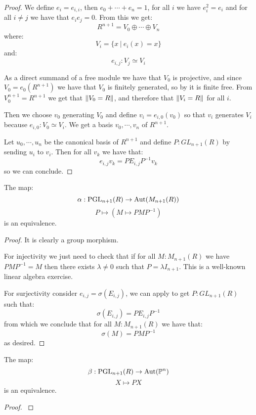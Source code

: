 \begin{proof}
We define $e_i = e_{i,i}$, then $e_0+\cdots+e_n = 1$, for all $i$ we have $e_i^2=e_i$ and for all $i\not=j$ we have that $e_ie_j=0$. From this we get:
\[R^{n+1} = V_0\oplus\cdots\oplus V_n\]
where:
\[V_i = \{x\ |\ e_i(x)=x\}\]
and:
\[e_{i,j}:V_j\simeq V_i\]

As a direct summand of a free module we have that $V_0$ is projective, and since $V_0 = e_{0}(R^{n+1})$ we have that $V_0$ is finitely generated, so by  it is finite free. From $V_0^{n+1}=R^{n+1}$ we get that $\lVert V_0=R \rVert$, and therefore that $\lVert V_i=R \rVert$ for all $i$.

Then we choose $v_0$ generating $V_0$ and define $v_i = e_{i,0}(v_0)$ so that $v_i$ generates $V_i$ because $e_{i,0}:V_0\simeq V_i$. We get a basis $v_0,\cdots,v_n$ of $R^{n+1}$.

Let $u_0,\cdots,u_n$ be the canonical basis of $R^{n+1}$ and define $P:GL_{n+1}(R)$ by sending $u_i$ to $v_i$. Then for all $v_k$ we have that:
\[e_{i,j}v_k = PE_{i,j}P^{-1}v_k\]
so we can conclude.
\end{proof}

\begin{proposition}\label{Aut-MnR-PGL}
The map:
\[\alpha:\operatorname{PGL}_{n+1}(R)\to\mathrm{Aut}(M_{n+1}(R))\]
\[P\mapsto (M\mapsto PMP^{-1})\]
is an equivalence.
\end{proposition}

\begin{proof}
It is clearly a group morphism. 

For injectivity we just need to check that if for all $M:M_{n+1}(R)$ we have $PMP^{-1}=M$ then there exists $\lambda\not=0$ such that $P=\lambda I_{n+1}$. This is a well-known linear algebra exercise.

For surjectivity consider $e_{i,j}=\sigma(E_{i,j})$, we can apply  to get $P:GL_{n+1}(R)$ such that:
\[\sigma(E_{i,j}) = PE_{i,j}P^{-1}\]
from which we conclude that for all $M:M_{n+1}(R)$ we have that:
\[\sigma(M) = PMP^{-1}\]
as desired.
\end{proof}

\begin{proposition}\label{Aut-Pn-PGL}
The map:
\[\beta:\operatorname{PGL}_{n+1}(R)\to\mathrm{Aut}(\mathbb{P}^n)\]
\[X\mapsto PX\]
is an equivalence.
\end{proposition}

\begin{proof}
\cite{TODO}
\end{proof}


